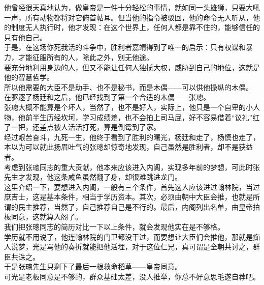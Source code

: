 \begin{multicols}{\theparacolNo}
他曾经很天真地认为，做皇帝是一件十分轻松的事情，就如同一头雄狮，只要大吼一声，所有动物都将对它俯首帖耳。但当他的指令被驳回，他的命令无人听从，他的制度无人执行时，他才发现：在这个世界上，任何人都是靠不住的，能够信任的只有他自己。\\

于是，在这场你死我活的斗争中，胜利者嘉靖得到了唯一的启示：只有权谋和暴力，才能征服所有的人，除此之外，别无他途。\\

要充分地利用身边的人，但又不能让任何人独揽大权，威胁到自己的地位，这就是他的智慧哲学。\\

所以他需要的大臣不是助手、也不是秘书，而是木偶——可以供他操纵的木偶。\\

在驱逐了杨廷和之后，他已经找到了第一个合适的木偶——张璁。\\

张璁大概不能算是个坏人，当然了，也不是好人，实际上，他只是一个自卑的小人物，他前半生历经坎坷，学习成绩差，也不会拍上司马屁，好不容易借着“议礼”红了一把，还差点被人活活打死，算是倒霉到了家。\\

经过艰苦奋斗，九死一生，他终于看到了胜利的曙光，杨廷和走了，杨慎也走了，本以为可以就此扬眉吐气的张璁却惊奇地发现，自己虽然是胜利者，却不是获益者。\\

考虑到张璁同志的重大贡献，他本来应该进入内阁，实现多年前的梦想，可此时张先生才发现，他这条咸鱼虽然翻了身，却很难跳进龙门。\\

这里介绍一下，要想进入内阁，一般有三个条件，首先这人应该进过翰林院，当过庶吉士，这是基本条件，相当于学历资本。其次，必须由朝中大臣会推，也就是所谓的民主推荐，当然了，自己推荐自己是不行的。最后，内阁列出名单，由皇帝拍板同意，这就算入阁了。\\

我们把张璁同志的简历对比一下以上条件，就会发现他实在是不够格。\\

学历就不用说了，他连翰林院的门卫都没干过，而要想让大臣们会推他，那就是痴人说梦，光是骂他的奏折就能把他活埋，对于这位仁兄，真可谓是全朝共讨之，群臣共诛之。\\

于是张璁先生只剩下了最后一根救命稻草——皇帝同意。\\

可光是老板同意是不够的，群众基础太差，没人推举，你总不好意思毛遂自荐吧。\\


\end{multicols}
